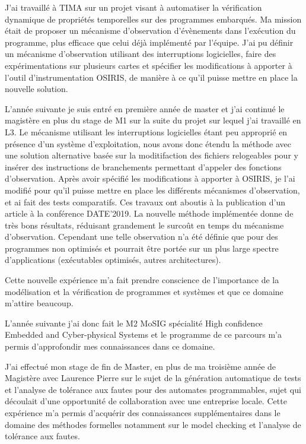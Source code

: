 \documentclass[11pt, a4paper]{awesome-cv} %
\begin{document}
J'ai travaillé à TIMA sur un projet visant à automatiser la
vérification dynamique de propriétés temporelles sur des programmes
embarqués. Ma mission était de proposer un mécanisme d'observation
d'évènements dans l'exécution du programme, plus efficace que celui
déjà implémenté par l'équipe. J'ai pu définir un mécanisme
d'observation utilisant des interruptions logicielles, faire des
expérimentations sur plusieurs cartes et spécifier les modifications
à apporter à l'outil d'instrumentation OSIRIS, de manière à ce qu'il
puisse mettre en place la nouvelle solution.


L'année suivante je suis entré en première année de master et j'ai
continué le magistère en plus du stage de M1 sur la suite du projet
sur lequel j'ai travaillé en L3. Le mécanisme utilisant les
interruptions logicielles étant peu approprié en présence d'un système
d'exploitation, nous avons donc étendu la méthode avec une solution
alternative basée sur la moditifaction des fichiers relogeables pour y
insérer des instructions de branchements permettant d'appeler des
fonctions d'observation. Après avoir spécifié les modifications à
apporter à OSIRIS, je l'ai modifié pour qu'il puisse mettre en place
les différents mécanismes d'observation, et ai fait des tests
comparatifs. Ces travaux ont aboutis à la publication d'un article à
la conférence DATE'2019. La nouvelle méthode implémentée donne de très
bons résultats, réduisant grandement le surcoût en temps du mécanisme
d'observation. Cependant une telle observation n'a été définie que
pour des programmes non optimisés et pourrait être portée sur un plus
large spectre d'applications (exécutables optimisés, autres
architectures).

Cette nouvelle expérience m'a fait prendre conscience de l'importance
de la modélisation et la vérification de programmes et systèmes et que
ce domaine m'attire beaucoup.

L'année suivante j'ai donc fait le M2 MoSIG spécialité High confidence
Embedded and Cyber-physical Systems et le programme de ce parcours m'a
permis d'approfondir mes connaissances dans ce domaine.

J'ai effectué mon stage de fin de Master, en plus de ma troisième
année de Magistère avec Laurence Pierre sur le sujet de la génération
automatique de tests et l'analyse de tolérance aux fautes pour des
automates programmables, sujet qui découlait d'une opportunité de
collaboration avec une entreprise locale. Cette expérience m'a permis
d'acquérir des connaissances supplémentaires dans le domaine des
méthodes formelles notamment sur le model checking et l'analyse de
tolérance aux fautes.
\end{document}
